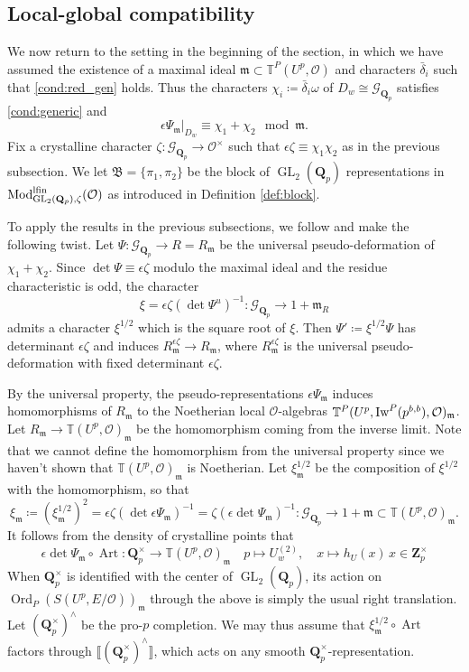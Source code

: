 \documentclass[leqno]{amsart}
\newcommand{\TT}{\mathbb{T}} %
\newcommand{\Iw}{\textnormal{Iw}}
\newcommand{\lfMod}{\textnormal{Mod}^{\textnormal{lfin}}}
\newcommand{\B}{\mathfrak B}
\newcommand{\Gp}{\mathcal{G}_{\Qp}} %
\DeclareMathOperator{\Ord}{Ord}
\DeclareMathOperator{\Art}{Art}
\DeclareMathOperator{\GL}{GL}
\newcommand{\Qp}{\mathbf{Q}_p}
\newcommand{\Zp}{\mathbf{Z}_p}
\newcommand{\oo}{\mathcal{O}} %
\newcommand{\fm}{\mathfrak{m}}
\theoremstyle{definition}
\theoremstyle{remark}
\begin{document}
\subsection{Local-global compatibility}\label{sub:uni_completion}

We now return to the setting in 
the beginning of the section,
in which we have assumed 
the existence of
a maximal ideal $\fm\subset \TT^P(U^p,\oo)$ 
and characters $\bar{\delta}_i$
such that \eqref{cond:red_gen} holds.
Thus the characters
$\chi_i\coloneqq\bar{\delta}_i\omega$
of $D_w\cong \Gp$
satisfies \eqref{cond:generic} and
\[
	\epsilon\Psi_\fm\vert_{D_w}\equiv
	\chi_1+\chi_2 \mod \fm.
\]
Fix a crystalline character 
$\zeta\colon \Gp\to \oo^\times$ 
such that $\epsilon\zeta\equiv \chi_1\chi_2$
as in the previous subsection.
We let $\B=\{\pi_1,\pi_2\}$
be the block of $\GL_2(\Qp)$
representations
in $\lfMod_{\GL_2(\Qp),\zeta}(\oo)$
as introduced in Definition \ref{def:block}.


To apply the results in the previous subsections,
we follow \cite{urban} and make the following twist.
Let $\Psi\colon \Gp\to R=R_{\fm}$ be 
the universal pseudo-deformation of $\chi_1+\chi_2$.
Since $\det\Psi\equiv \epsilon\zeta$ modulo the 
maximal ideal and the residue characteristic is odd,
the character
\[
	\xi=\epsilon\zeta(\det \Psi^u)^{-1}\colon
	\Gp\to 1+\fm_R
\]
admits a character $\xi^{1/2}$ which is the square root of $\xi$.
Then  $\Psi'\coloneqq \xi^{1/2}\Psi$ has determinant $\epsilon\zeta$
and induces $R_\fm^{\epsilon\zeta}\to R_\fm$,
where $R_\fm^{\epsilon\zeta}$ is the universal 
pseudo-deformation with fixed determinant $\epsilon\zeta$.

By the universal property,
the pseudo-representations
$\epsilon\Psi_{\fm}$
induces homomorphisms of $R_\fm$ 
to the Noetherian local $\oo$-algebras
$\TT^P(U^p,\Iw^P(p^{b,b}),\oo)_{\fm}$.
Let $R_{\fm}\to \TT(U^p,\oo)_{\fm}$
be the homomorphism
coming from the inverse limit.
Note that we cannot define the homomorphism
from the universal property
since we haven't shown that
$\TT(U^p,\oo)_{\fm}$ is Noetherian.
Let $\xi_\fm^{1/2}$ be the  composition 
of $\xi^{1/2}$ with the homomorphism,
so that 
\[
	\xi_\fm\coloneqq(\xi_\fm^{1/2})^2=
	\epsilon\zeta(\det \epsilon\Psi_\fm)^{-1}
	=\zeta(\epsilon\det \Psi_\fm)^{-1}\colon
	\Gp\to 1+\fm\subset \TT(U^p,\oo)_\fm.
\]
It follows from the density of crystalline points
that 
\[
	\epsilon\det\Psi_\fm\circ \Art\colon
	\Qp^\times\to \TT(U^p,\oo)_{\fm}\quad
	p\mapsto U_w^{(2)},\quad
	x\mapsto h_U(x)\,x\in\Zp^\times
\]
When $\Qp^\times$
is identified with the center of  $\GL_2(\Qp)$,
its action on $\Ord_P(S(U^p,E/\oo))_{\fm}$
through the above
is simply the usual right translation.
Let $(\Qp^\times)^\wedge$ be the pro-$p$ completion. 
We may thus assume that 
$\xi_{\fm}^{1/2}\circ \Art$
factors through $\llbracket (\Qp^\times)^\wedge\rrbracket$,
which acts on any smooth $\Qp^\times$-representation.
\end{document}
